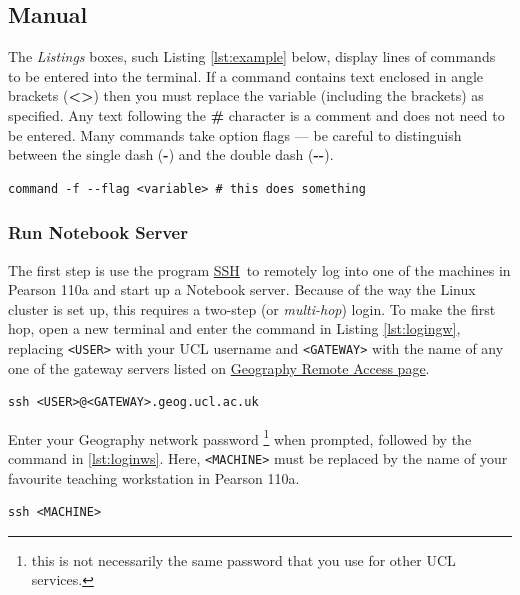 \documentclass[a4paper]{article}
\begin{document}
\subsection{Manual}
\label{sec:manual}

The \emph{Listings} boxes, such Listing \ref{lst:example} below, display lines of commands to be entered into the terminal.
If a command contains text enclosed in angle brackets (\textbf{\textless{}\textgreater{}}) then you must replace the variable (including the brackets) as specified.
Any text following the \textbf{\#} character is a comment and does not need to be entered.
Many commands take option flags --- be careful to distinguish between the single dash (\textbf{-}) and the double dash (\textbf{-{}-}).
\begin{lstlisting}[caption={An example of a command}, label={lst:example}]
command -f --flag <variable> # this does something
\end{lstlisting}

\subsubsection{Run Notebook Server}
\label{sec:runnb}

The first step is use the program \href{http://linuxcommand.org/man_pages/ssh1.html}{SSH}~to remotely log into one of the machines in Pearson 110a and start up a Notebook server.
Because of the way the Linux cluster is set up, this requires a two-step (or \emph{multi-hop}) login.
To make the first hop, open a new terminal and enter the command in Listing \ref{lst:logingw}, replacing \texttt{\textless{}USER\textgreater{}} with your UCL username and \texttt{\textless{}GATEWAY\textgreater{}} with the name of any one of the gateway servers listed on \href{http://www.geog.ucl.ac.uk/resources/computer-support/linux-remote-access}{Geography Remote Access page}.

\begin{lstlisting}[caption={Login to gateway}, label={lst:logingw}]
ssh <USER>@<GATEWAY>.geog.ucl.ac.uk
\end{lstlisting}

Enter your Geography network password \footnote{this is not necessarily the same password that you use for other UCL services.} when prompted, followed by the command in \ref{lst:loginws}.
Here, \texttt{\textless{}MACHINE\textgreater{}} must be replaced by the name of your favourite teaching workstation in Pearson 110a.

\begin{lstlisting}[caption={Login to workstation}, label={lst:loginws}]
ssh <MACHINE>
\end{lstlisting}
\end{document}
